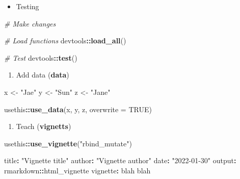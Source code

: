 \documentclass[
]{book}
\newenvironment{Shaded}{\begin{snugshade}}{\end{snugshade}}
\newcommand{\CommentTok}[1]{\textcolor[rgb]{0.56,0.35,0.01}{\textit{#1}}}
\newcommand{\DataTypeTok}[1]{\textcolor[rgb]{0.13,0.29,0.53}{#1}}
\newcommand{\KeywordTok}[1]{\textcolor[rgb]{0.13,0.29,0.53}{\textbf{#1}}}
\newcommand{\NormalTok}[1]{#1}
\newcommand{\OperatorTok}[1]{\textcolor[rgb]{0.81,0.36,0.00}{\textbf{#1}}}
\newcommand{\OtherTok}[1]{\textcolor[rgb]{0.56,0.35,0.01}{#1}}
\newcommand{\StringTok}[1]{\textcolor[rgb]{0.31,0.60,0.02}{#1}}
\providecommand{\tightlist}{%
  \setlength{\itemsep}{0pt}\setlength{\parskip}{0pt}}
\begin{document}
\begin{itemize}
\tightlist
\item
  Testing
\end{itemize}

\begin{Shaded}
\begin{Highlighting}[]
\CommentTok{\# Make changes }

\CommentTok{\# Load functions }
\NormalTok{devtools}\OperatorTok{::}\KeywordTok{load\_all}\NormalTok{()}

\CommentTok{\# Test }
\NormalTok{devtools}\OperatorTok{::}\KeywordTok{test}\NormalTok{()}
\end{Highlighting}
\end{Shaded}

\begin{enumerate}
\def\labelenumi{\arabic{enumi}.}
\setcounter{enumi}{1}
\tightlist
\item
  Add data (\textbf{data})
\end{enumerate}

\begin{Shaded}
\begin{Highlighting}[]
\NormalTok{x \textless{}{-}}\StringTok{ "Jae"}
\NormalTok{y \textless{}{-}}\StringTok{ "Sun"}
\NormalTok{z \textless{}{-}}\StringTok{ "Jane"}

\NormalTok{usethis}\OperatorTok{::}\KeywordTok{use\_data}\NormalTok{(x, y, z, }\DataTypeTok{overwrite =} \OtherTok{TRUE}\NormalTok{)}
\end{Highlighting}
\end{Shaded}

\begin{enumerate}
\def\labelenumi{\arabic{enumi}.}
\setcounter{enumi}{2}
\tightlist
\item
  Teach (\textbf{vignetts})
\end{enumerate}

\begin{Shaded}
\begin{Highlighting}[]
\NormalTok{usethis}\OperatorTok{::}\KeywordTok{use\_vignette}\NormalTok{(}\StringTok{"rbind\_mutate"}\NormalTok{)}
\end{Highlighting}
\end{Shaded}

\begin{Shaded}
\begin{Highlighting}[]
\NormalTok{title}\OperatorTok{:}\StringTok{ "Vignette title"}
\NormalTok{author}\OperatorTok{:}\StringTok{ "Vignette author"}
\NormalTok{date}\OperatorTok{:}\StringTok{ "2022{-}01{-}30"}
\NormalTok{output}\OperatorTok{:}\StringTok{ }\NormalTok{rmarkdown}\OperatorTok{::}\NormalTok{html\_vignette}
\NormalTok{vignette}\OperatorTok{:}\StringTok{ }\NormalTok{blah blah}
\end{Highlighting}
\end{Shaded}
\end{document}
